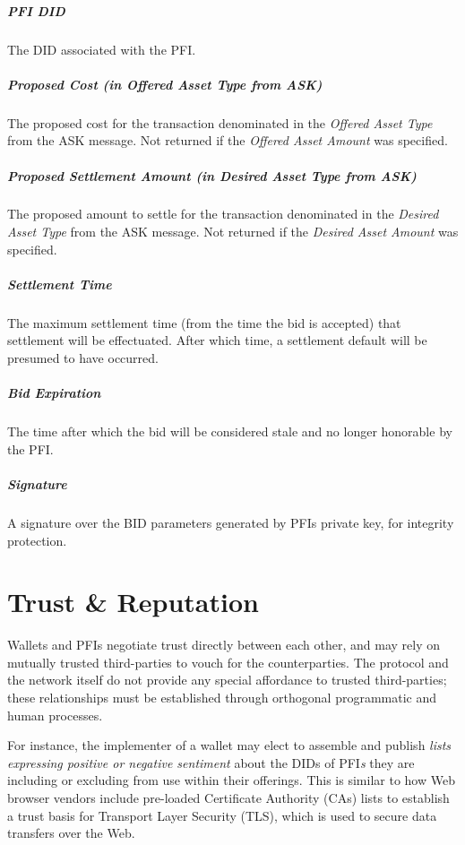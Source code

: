 \documentclass[11pt]{article}
\begin{document}
\subparagraph{PFI DID}

The DID associated with the PFI. 

\subparagraph{Proposed Cost (in Offered Asset Type from ASK)}

The proposed cost for the transaction denominated in the \textit{Offered Asset Type} from the ASK message. Not returned if the \textit{Offered Asset Amount} was specified. 

\subparagraph{Proposed Settlement Amount (in Desired Asset Type from ASK)}

The proposed amount to settle for the transaction denominated in the \textit{Desired Asset Type} from the ASK message. Not returned if the \textit{Desired Asset Amount} was specified. 

\subparagraph{Settlement Time}

The maximum settlement time (from the time the bid is accepted) that settlement will be effectuated. After which time, a settlement default will be presumed to have occurred. 

\subparagraph{Bid Expiration}

The time after which the bid will be considered stale and no longer honorable by the PFI. 

\subparagraph{Signature}

A signature over the BID parameters generated by PFIs private key, for integrity protection. 

\vspace{2\baselineskip}
\section{Trust & Reputation}

\vspace{1\baselineskip}
Wallets and PFIs negotiate trust directly between each other, and may rely on mutually trusted third-parties to vouch for the counterparties. The protocol and the network itself do not provide any special affordance to trusted third-parties; these relationships must be established through orthogonal programmatic and human processes.  

\vspace{1\baselineskip}
For instance, the implementer of a wallet may elect to assemble and publish \textit{lists expressing positive or negative sentiment} about the DIDs of PFI\textit{s }they are including or excluding from use within their offerings. This is similar to how Web browser vendors include pre-loaded Certificate Authority (CAs) lists to establish a trust basis for Transport Layer Security (TLS), which is used to secure data transfers over the Web. 
\end{document}
